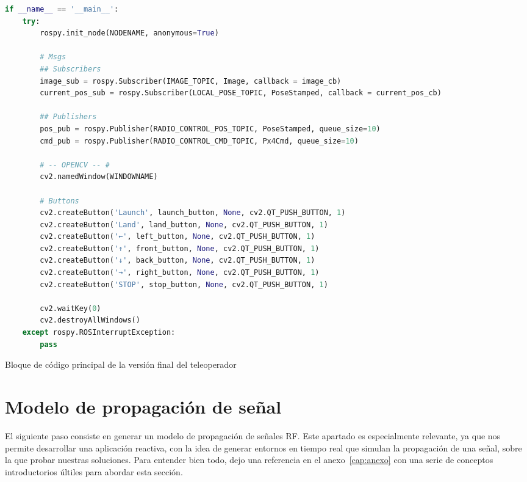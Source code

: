 \begin{code}[H]
\begin{lstlisting}[language=Python]
if __name__ == '__main__':
    try:
        rospy.init_node(NODENAME, anonymous=True)

        # Msgs
        ## Subscribers
        image_sub = rospy.Subscriber(IMAGE_TOPIC, Image, callback = image_cb)
        current_pos_sub = rospy.Subscriber(LOCAL_POSE_TOPIC, PoseStamped, callback = current_pos_cb)

        ## Publishers
        pos_pub = rospy.Publisher(RADIO_CONTROL_POS_TOPIC, PoseStamped, queue_size=10)
        cmd_pub = rospy.Publisher(RADIO_CONTROL_CMD_TOPIC, Px4Cmd, queue_size=10)

        # -- OPENCV -- #
        cv2.namedWindow(WINDOWNAME)

        # Buttons
        cv2.createButton('Launch', launch_button, None, cv2.QT_PUSH_BUTTON, 1)
        cv2.createButton('Land', land_button, None, cv2.QT_PUSH_BUTTON, 1)
        cv2.createButton('←', left_button, None, cv2.QT_PUSH_BUTTON, 1)
        cv2.createButton('↑', front_button, None, cv2.QT_PUSH_BUTTON, 1)
        cv2.createButton('↓', back_button, None, cv2.QT_PUSH_BUTTON, 1)
        cv2.createButton('→', right_button, None, cv2.QT_PUSH_BUTTON, 1)
        cv2.createButton('STOP', stop_button, None, cv2.QT_PUSH_BUTTON, 1)

        cv2.waitKey(0)
        cv2.destroyAllWindows()
    except rospy.ROSInterruptException:
        pass
\end{lstlisting}
\caption[Bloque de código principal de la versión final del teleoperador]{Bloque de código principal de la versión final del teleoperador}
\label{cod:c2c_app}
\end{code}

\section{Modelo de propagación de señal}
\label{sec:signals}

El siguiente paso consiste en generar un modelo de propagación de señales \ac{RF}. Este apartado es especialmente relevante, ya que nos permite desarrollar una aplicación reactiva, con la idea de generar entornos en tiempo real que simulan la propagación de una señal, sobre la que probar nuestras soluciones. Para entender bien todo, dejo una referencia en el anexo~\ref{cap:anexo} con una serie de conceptos introductorios últiles para abordar esta sección.\\

